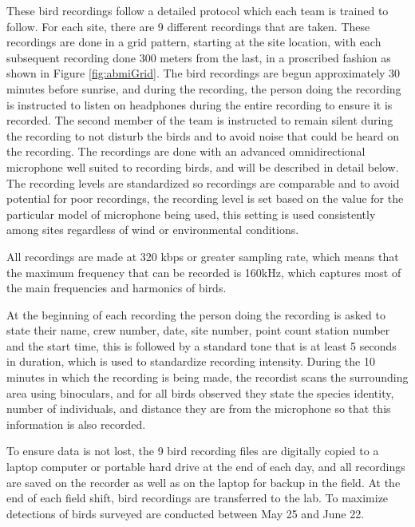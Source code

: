 \documentclass[12pt,oneside]{book}
\begin{document}
These bird recordings follow a detailed protocol which each team is
trained to follow.  For each site, there are 9 different recordings
that are taken.  These recordings are done in a grid pattern, starting
at the site location, with each subsequent recording done 300 meters
from the last, in a proscribed fashion as shown in Figure
\ref{fig:abmiGrid}.  The bird recordings are begun approximately 30
minutes before sunrise, and during the recording, the person doing the
recording is instructed to listen on headphones during the entire
recording to ensure it is recorded.  The second member of the team is
instructed to remain silent during the recording to not disturb the
birds and to avoid noise that could be heard on the recording.  The
recordings are done with an advanced omnidirectional microphone well
suited to recording birds, and will be described in detail below.  The
recording levels are standardized so recordings are comparable and to
avoid potential for poor recordings, the recording level is set based
on the value for the particular model of microphone being used, this
setting is used consistently among sites regardless of wind or
environmental conditions.

All recordings are made at 320 kbps or greater sampling rate, which
means that the maximum frequency that can be recorded is 160kHz, which
captures most of the main frequencies and harmonics of birds.

At the beginning of each recording the person doing the recording is
asked to state their name, crew number, date, site number, point count
station number and the start time, this is followed by a standard tone
that is at least 5 seconds in duration, which is used to standardize
recording intensity.  During the 10 minutes in which the recording is
being made, the recordist scans the surrounding area using binoculars,
and for all birds observed they state the species identity, number of
individuals, and distance they are from the microphone so that this
information is also recorded.

To ensure data is not lost, the 9 bird recording files are digitally
copied to a laptop computer or portable hard drive at the end of each
day, and all recordings are saved on the recorder as well as on the
laptop for backup in the field.  At the end of each field shift, bird
recordings are transferred to the lab.  To maximize detections of
birds surveyed are conducted between May 25 and June 22.  
\end{document}
